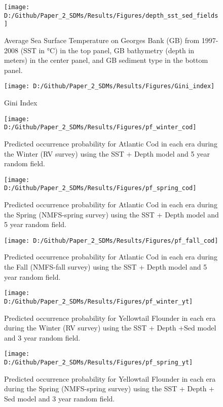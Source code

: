 \documentclass[
]{article}
\begin{document}
\clearpage
\begin{figure}
\texttt{[image: D:/Github/Paper\_2\_SDMs/Results/Figures/depth\_sst\_sed\_fields]} \caption{Average Sea Surface Temperature on Georges Bank (GB) from 1997-2008 (SST in °C) in the top panel, GB bathymetry (depth in meters) in the center panel, and GB sediment type in the bottom panel.}\label{fig:SST-Dep-Sed}
\end{figure}

\begin{landscape}
\begin{figure}
\texttt{[image: D:/Github/Paper\_2\_SDMs/Results/Figures/Gini\_index]} \caption{Gini Index }\label{fig:gini-index}
\end{figure}

\newpage
\begin{figure}
\texttt{[image: D:/Github/Paper\_2\_SDMs/Results/Figures/pf\_winter\_cod]} \caption{Predicted occurrence probability for Atlantic Cod  in each era during the Winter (RV survey) using the SST + Depth model and 5 year random field.}\label{fig:pf-winter-cod}
\end{figure}

\newpage
\begin{figure}
\texttt{[image: D:/Github/Paper\_2\_SDMs/Results/Figures/pf\_spring\_cod]} \caption{Predicted occurrence probability for Atlantic Cod  in each era during the Spring (NMFS-spring survey) using the SST + Depth model and 5 year random field.}\label{fig:pf-spring-cod}
\end{figure}

\newpage
\begin{figure}
\texttt{[image: D:/Github/Paper\_2\_SDMs/Results/Figures/pf\_fall\_cod]} \caption{Predicted occurrence probability for Atlantic Cod  in each era during the Fall (NMFS-fall survey) using the SST + Depth model and 5 year random field.}\label{fig:pf-fall-cod}
\end{figure}

\newpage
\begin{figure}
\texttt{[image: D:/Github/Paper\_2\_SDMs/Results/Figures/pf\_winter\_yt]} \caption{Predicted occurrence probability for Yellowtail Flounder in each era during the Winter (RV survey) using the SST + Depth +Sed model and 3 year random field.}\label{fig:pf-winter-yt}
\end{figure}

\newpage
\begin{figure}
\texttt{[image: D:/Github/Paper\_2\_SDMs/Results/Figures/pf\_spring\_yt]} \caption{Predicted occurrence probability for Yellowtail Flounder in each era during the Spring (NMFS-spring survey) using the SST + Depth + Sed  model and 3 year random field.}\label{fig:pf-spring-yt}
\end{figure}


\end{landscape}
\end{document}
